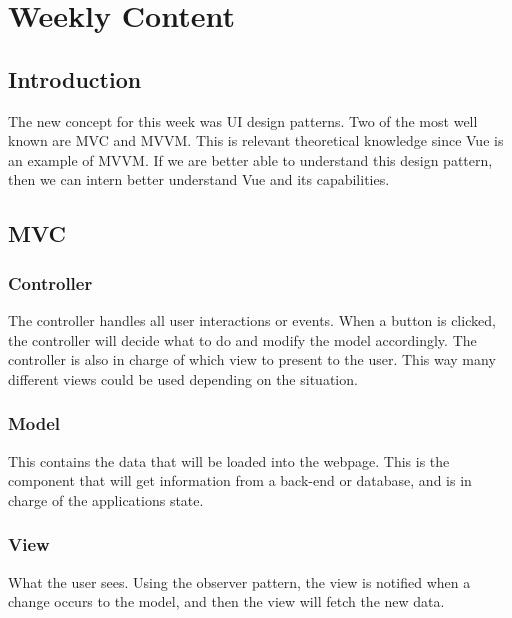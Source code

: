 \documentclass[portfolio.tex]{subfiles}
\begin{document}
		\section{Weekly Content}
			\subsection{Introduction}
				The new concept for this week was UI design patterns. Two of the most well known are MVC and MVVM. This is relevant theoretical knowledge since Vue is an example of MVVM. If we are better able to understand this design pattern, then we can intern better understand Vue and its capabilities.

			\subsection{MVC}


				\subsubsection{Controller}
					The controller handles all user interactions or events. When a button is clicked, the controller will decide what to do and modify the model accordingly. The controller is also in charge of which view to present to the user. This way many different views could be used depending on the situation.

				\subsubsection{Model}
					This contains the data that will be loaded into the webpage.  This is the component that will get information from a back-end or database, and is in charge of the applications state.

				\subsubsection{View}
					What the user sees. Using the observer pattern, the view is notified when a change occurs to the model, and then the view will fetch the new data.
\end{document}
